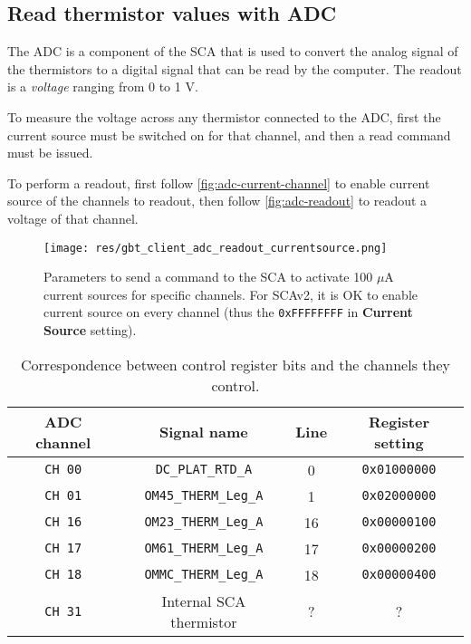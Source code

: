 \subsection{Read thermistor values with ADC}
The ADC is a component of the SCA that is used to convert the analog signal of
the thermistors to a digital signal that can be read by the computer.
The readout is a \emph{voltage} ranging from 0 to 1 V.

To measure the voltage across any thermistor connected to the ADC, first the
current source must be switched on for that channel, and then a read command
must be issued.

To perform a readout, first follow \autoref{fig:adc-current-channel} to enable
current source of the channels to readout,
then follow \autoref{fig:adc-readout} to readout a voltage of that channel.

\begin{figure}[ht]
    \centering
    \texttt{[image: res/gbt\_client\_adc\_readout\_currentsource.png]}
    \caption{
        Parameters to send a command to the SCA to activate 100 $\mu$A current
        sources for specific channels.
        For SCAv2, it is OK to enable current source on every channel (thus the
        \texttt{0xFFFFFFFF} in \textbf{Current Source} setting).
    }
    \label{fig:adc-current-channel}
\end{figure}

\begin{table}[ht]
    \begin{tabular}{cccc}
        \toprule
        ADC channel & Signal name & Line & Register setting \\
        \midrule
        \texttt{CH 00} & \texttt{DC\_PLAT\_RTD\_A}    & 0  & \texttt{0x01000000} \\
        \texttt{CH 01} & \texttt{OM45\_THERM\_Leg\_A} & 1  & \texttt{0x02000000} \\
        \texttt{CH 16} & \texttt{OM23\_THERM\_Leg\_A} & 16 & \texttt{0x00000100} \\
        \texttt{CH 17} & \texttt{OM61\_THERM\_Leg\_A} & 17 & \texttt{0x00000200} \\
        \texttt{CH 18} & \texttt{OMMC\_THERM\_Leg\_A} & 18 & \texttt{0x00000400} \\
        \texttt{CH 31} & Internal SCA thermistor      & ?  & ? \\
        \bottomrule
    \end{tabular}
    \caption{
        Correspondence between control register bits and the channels they
        control.
    }
    \label{tab:register-channel-correspondence}
\end{table}


